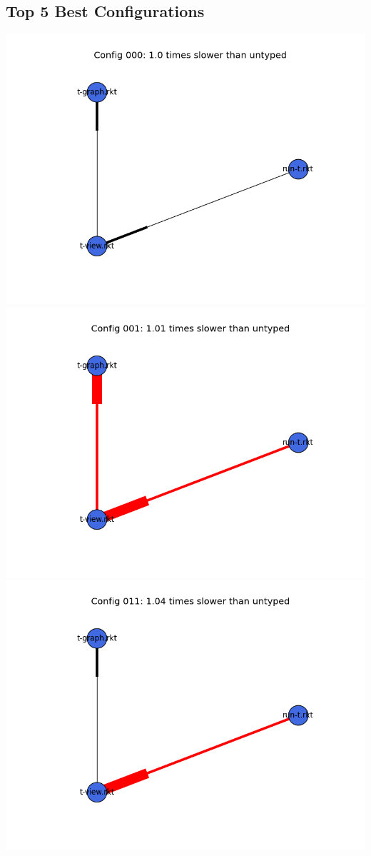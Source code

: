 \documentclass{article}
\begin{document}
\begin{itemize}
\subsection{Top 5 Best Configurations}
\includegraphics[width=\textwidth]{mbta-stressfree-module-graph-000.png}
\includegraphics[width=\textwidth]{mbta-stressfree-module-graph-001.png}
\includegraphics[width=\textwidth]{mbta-stressfree-module-graph-011.png}

\end{itemize}
\end{document}
